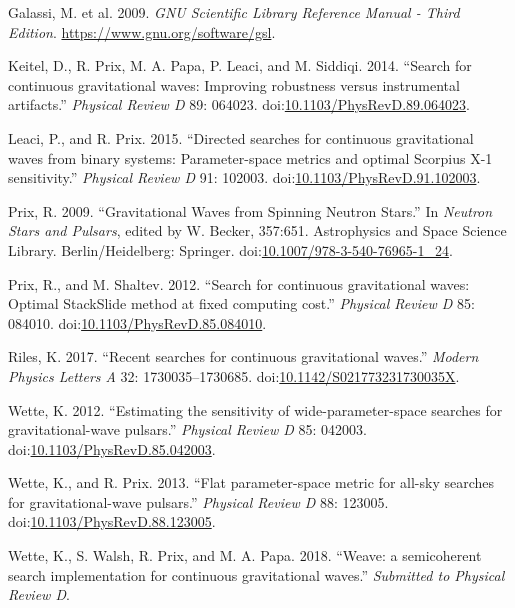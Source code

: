 \documentclass[10pt,a4paper,onecolumn]{article}
\begin{document}
\hypertarget{ref-GSL2009}{}
Galassi, M. et al. 2009. \emph{GNU Scientific Library Reference Manual -
Third Edition}. \url{https://www.gnu.org/software/gsl}.

\hypertarget{ref-KeitEtAl2014a}{}
Keitel, D., R. Prix, M. A. Papa, P. Leaci, and M. Siddiqi. 2014.
``Search for continuous gravitational waves: Improving robustness versus
instrumental artifacts.'' \emph{Physical Review D} 89: 064023.
doi:\href{https://doi.org/10.1103/PhysRevD.89.064023}{10.1103/PhysRevD.89.064023}.

\hypertarget{ref-LeacPrix2015a}{}
Leaci, P., and R. Prix. 2015. ``Directed searches for continuous
gravitational waves from binary systems: Parameter-space metrics and
optimal Scorpius X-1 sensitivity.'' \emph{Physical Review D} 91: 102003.
doi:\href{https://doi.org/10.1103/PhysRevD.91.102003}{10.1103/PhysRevD.91.102003}.

\hypertarget{ref-Prix2009a}{}
Prix, R. 2009. ``Gravitational Waves from Spinning Neutron Stars.'' In
\emph{Neutron Stars and Pulsars}, edited by W. Becker, 357:651.
Astrophysics and Space Science Library. Berlin/Heidelberg: Springer.
doi:\href{https://doi.org/10.1007/978-3-540-76965-1_24}{10.1007/978-3-540-76965-1\_24}.

\hypertarget{ref-PrixShal2012a}{}
Prix, R., and M. Shaltev. 2012. ``Search for continuous gravitational
waves: Optimal StackSlide method at fixed computing cost.''
\emph{Physical Review D} 85: 084010.
doi:\href{https://doi.org/10.1103/PhysRevD.85.084010}{10.1103/PhysRevD.85.084010}.

\hypertarget{ref-Rile2017a}{}
Riles, K. 2017. ``Recent searches for continuous gravitational waves.''
\emph{Modern Physics Letters A} 32: 1730035--1730685.
doi:\href{https://doi.org/10.1142/S021773231730035X}{10.1142/S021773231730035X}.

\hypertarget{ref-Wett2012a}{}
Wette, K. 2012. ``Estimating the sensitivity of wide-parameter-space
searches for gravitational-wave pulsars.'' \emph{Physical Review D} 85:
042003.
doi:\href{https://doi.org/10.1103/PhysRevD.85.042003}{10.1103/PhysRevD.85.042003}.

\hypertarget{ref-WettPrix2013a}{}
Wette, K., and R. Prix. 2013. ``Flat parameter-space metric for all-sky
searches for gravitational-wave pulsars.'' \emph{Physical Review D} 88:
123005.
doi:\href{https://doi.org/10.1103/PhysRevD.88.123005}{10.1103/PhysRevD.88.123005}.

\hypertarget{ref-Wett2018a}{}
Wette, K., S. Walsh, R. Prix, and M. A. Papa. 2018. ``Weave: a
semicoherent search implementation for continuous gravitational waves.''
\emph{Submitted to Physical Review D}.
\end{document}

